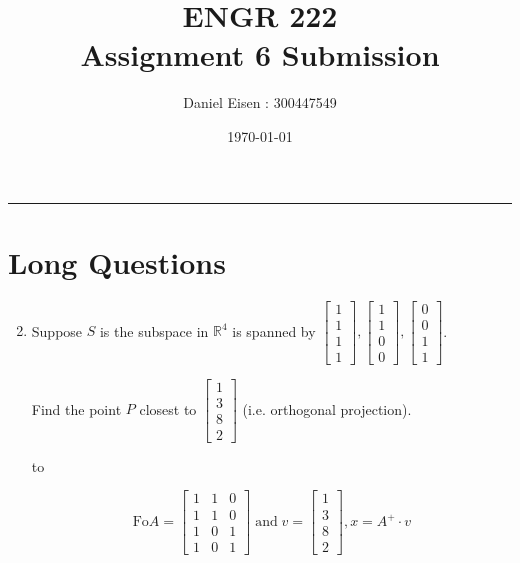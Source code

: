 \documentclass[11pt]{article}
\title{ENGR 222 \\ Assignment 6 Submission}
\author{Daniel Eisen : 300447549}
\date{\today}
\newcommand{\hdotrule}[1]{\hbox to \textwidth{\leaders\hbox to #1pt{\hss . \hss}\hfil}}
\begin{document}
\begin{preview}

      \maketitle
      \hrule
      \section*{Long Questions}
      \begin{enumerate}
            \setcounter{enumi}{1}
            \item Suppose $S$ is the subspace in $\mathbb{R}^4$ is spanned by $\begin{bmatrix} 1\\1\\1\\1 \end{bmatrix},\begin{bmatrix} 1\\1\\0\\0 \end{bmatrix},\begin{bmatrix} 0\\0\\1\\1 \end{bmatrix}$. 
            
            Find the point $P$ closest to $\begin{bmatrix}1\\3\\8\\2\end{bmatrix}$ (i.e. orthogonal projection).

            \hdotrule{5}

            $$\mathrm{Fo} A = \begin{bmatrix}1&1&0\\ 1&1&0\\ 1&0&1\\ 1&0&1 \end{bmatrix} \mathrm{\; and \;} v = \begin{bmatrix}1\\3\\8\\2\end{bmatrix}, x=A^{+}{\cdot}v$$


\end{enumerate}
\end{preview}
\end{document}
